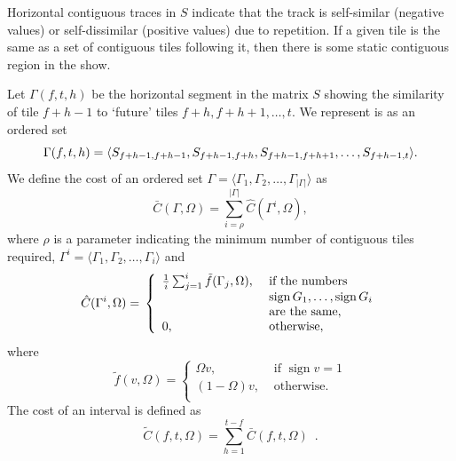 \documentclass[twocolumn]{article}
\newcommand{\sign}{\mathop{\mathrm{sign}}}
\begin{document}
	
Horizontal contiguous traces in $S$ indicate that the track is
self-similar (negative values) or self-dissimilar (positive values)
due to repetition. If a given tile is the same as a set of contiguous
tiles following it, then there is some static contiguous region in the
show.

Let $\Gamma(f,t,h)$ be the horizontal segment in the matrix $S$
showing the similarity of tile $f+h-1$ to `future' tiles $f+h,
f+h+1,\ldots, t$. We represent is as an ordered set
\begin{dmath*}
\Gamma(f,t,h) =  \langle S_{f+h-1,f+h-1}, S_{f+h-1,f+h}, S_{f+h-1,f+h+1},\ldots,\\
S_{f+h-1,t}\rangle.
\end{dmath*} 
We define the cost of an ordered set $\Gamma=\langle
\Gamma_1,\Gamma_2,\ldots,\Gamma_{|\Gamma|}\rangle$ as
$$
\bar C(\Gamma,\Omega)=\sum_{i=\rho}^{|\Gamma|}\hat C(\Gamma^i,\Omega),
$$ 
where $\rho$ is a parameter indicating the minimum number of
contiguous tiles required, $\Gamma^i=\langle
\Gamma_1,\Gamma_2,\ldots,\Gamma_i\rangle$ and
\begin{dmath*}
\hat C(\Gamma^i,\Omega)=\\ \left\{
\begin{array}{ll}
\frac{1}{i}\sum_{j=1}^i\tilde{f}(\Gamma_j,\Omega),&
 \text{~if the numbers~} \\
& ~\sign{G_1},\ldots,\sign{G_i}\\
& \text{~are the same},\\
0, & \text{~otherwise},
\end{array}
\right.
\end{dmath*}
where
\begin{dmath*}
\tilde{f}(v,\Omega) = \left\{ 
	\begin{array}{lr}
		\Omega v, & \text{~if~} \sign v=1 \\
		(1-\Omega) v, & \mbox{~otherwise.}    \\
	\end{array}
	\right.
\end{dmath*}
The cost of an interval is defined as
\begin{dmath*}
\tilde C(f,t,\Omega) = \sum_{h=1}^{t-f}\bar C(f,t,\Omega)\enspace.
\end{dmath*}



\end{document}
